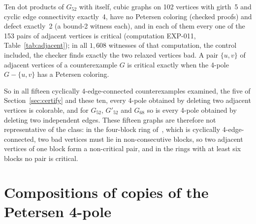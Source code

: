 \documentclass[11pt]{article}
\theoremstyle{definition}
\theoremstyle{remark}
\newcommand{\Gfty}{G_{52}}
\newcommand{\Gftyb}{G'_{52}}
\newcommand{\Gsix}{G_{68}}
\begin{document}
\begin{table}[htbp]\centering\footnotesize\setlength{\tabcolsep}{6pt}

\caption{Distance sets of the decided pairs of edges of $\Gfty$ (computation EXP-010); each UNSAT
distance carries a checked proof.}\label{tab:distance}
\end{table}

Ten dot products of $\Gfty$ with itself, cubic graphs on 102 vertices with girth~5 and cyclic edge
connectivity exactly~4, have no Petersen coloring (checked proofs) and defect exactly~2 (a bound-2
witness each), and in each of them every one of the 153 pairs of adjacent vertices is critical
(computation EXP-011, Table~\ref{tab:adjacent}); in all $1{,}608$ witnesses of that computation, the
control included, the checker finds exactly the two relaxed vertices bad. A pair $\{u, v\}$ of
adjacent vertices of a counterexample $G$ is critical exactly when the 4-pole $G - \{u, v\}$ has a
Petersen coloring.

\begin{table}[htbp]\centering\footnotesize\setlength{\tabcolsep}{4pt}

\caption{Adjacent-pair criticality of the ten dot products of $\Gfty$ with itself, and of $\Gfty$ as a
control (computation EXP-011). The ten graphs are cyclically 4-edge-connected: the four edges joining
the two parts form a cycle-separating cut and no cycle-separating cut has at most three edges.}\label{tab:adjacent}
\end{table}

So in all fifteen cyclically 4-edge-connected counterexamples examined, the five of
Section~\ref{sec:certify} and these ten, every 4-pole obtained by deleting two adjacent vertices is
colorable, and for $\Gfty$, $\Gftyb$ and $\Gsix$ so is every 4-pole obtained by deleting two
independent edges. These fifteen graphs are therefore not representative of the class: in the
four-block ring of~\cite{UD2026}, which is cyclically 4-edge-connected, two bad vertices must lie
in non-consecutive blocks, so two adjacent vertices of one block form a non-critical pair, and in
the rings with at least six blocks no pair is critical.

\section{Compositions of copies of the Petersen 4-pole}\label{sec:compositions}
\end{document}
